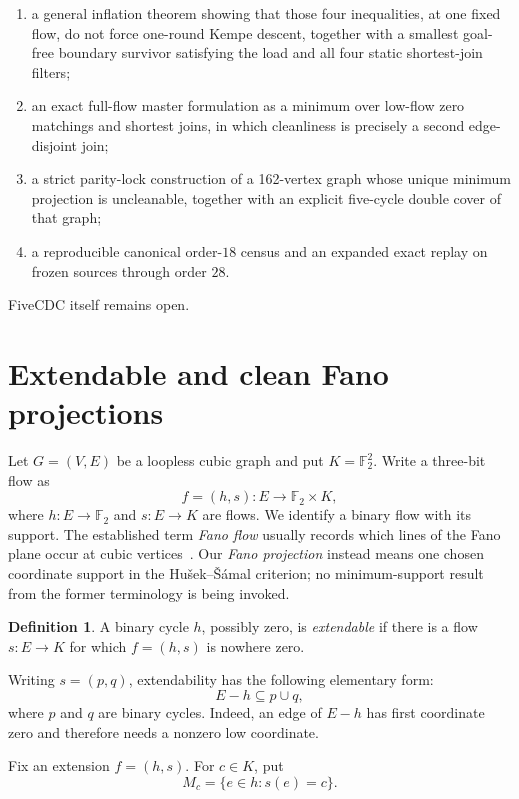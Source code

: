 \documentclass[11pt]{article}
\theoremstyle{definition}
\newtheorem{definition}[theorem]{Definition}
\theoremstyle{remark}
\newcommand{\F}{\mathbb F}
\begin{document}
\begin{enumerate}
  \item a general inflation theorem showing that those four inequalities,
        at one fixed flow, do not force one-round Kempe descent, together
        with a smallest goal-free boundary survivor satisfying the load
        and all four static shortest-join filters;
  \item an exact full-flow master formulation as a minimum over low-flow
        zero matchings and shortest joins, in which cleanliness is
        precisely a second edge-disjoint join;
  \item a strict parity-lock construction of a 162-vertex graph whose
        unique minimum projection is uncleanable, together with an
        explicit five-cycle double cover of that graph;
  \item a reproducible canonical order-\(18\) census and an expanded
        exact replay on frozen sources through order \(28\).
\end{enumerate}
FiveCDC itself remains open.

\section{Extendable and clean Fano projections}

Let \(G=(V,E)\) be a loopless cubic graph and put \(K=\F_2^2\).
Write a three-bit flow as
\[
                 f=(h,s):E\longrightarrow \F_2\times K,       \tag{1}
\]
where \(h:E\to\F_2\) and \(s:E\to K\) are flows.  We identify a binary
flow with its support.
The established term \emph{Fano flow} usually records which lines of the
Fano plane occur at cubic vertices~\cite{MacajovaSkoviera2005,
JinMazzuoccoloSteffen2016}.  Our \emph{Fano projection} instead means one
chosen coordinate support in the Hu\v{s}ek--\v{S}\'amal criterion; no
minimum-support result from the former terminology is being invoked.

\begin{definition}
A binary cycle \(h\), possibly zero, is \emph{extendable} if there is a flow
\(s:E\to K\) for which \(f=(h,s)\) is nowhere zero.
\end{definition}

Writing \(s=(p,q)\), extendability has the following elementary form:
\[
                         E-h\subseteq p\cup q,                 \tag{2}
\]
where \(p\) and \(q\) are binary cycles.  Indeed, an edge of \(E-h\) has
first coordinate zero and therefore needs a nonzero low coordinate.

Fix an extension \(f=(h,s)\).  For \(c\in K\), put
\[
                         M_c=\{e\in h:s(e)=c\}.                \tag{3}
\]
\end{document}
